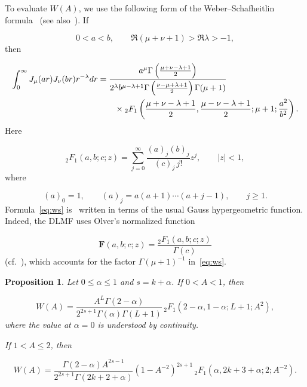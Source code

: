 \documentclass[11pt]{article}
\theoremstyle{plain}
\newtheorem{proposition}[theorem]{Proposition}
\theoremstyle{definition}
\theoremstyle{remark}
\begin{document}
To evaluate $W(A)$, we use the following form of the Weber--Schafheitlin formula~\cite[Eq.~10.22.56]{r1} (see also~\cite[Section~13.4]{r8}). If

\[
  0 < a < b , \qquad  \Re (\mu + \nu + 1) > \Re \lambda > -1 ,
\]
then

\begin{align}
  \int_{0}^{\infty } J_\mu (ar) J_\nu (br) r^{-\lambda } dr
  &= \frac{a^\mu \Gamma \left( \frac{\mu +\nu -\lambda +1}{2} \right)}{2^\lambda b^{\mu -\lambda +1} \Gamma \left( \frac{\nu -\mu +\lambda +1}{2} \right) \Gamma (\mu +1)} \notag \\
  &\qquad \times {}_{2}F_{1}\left( \frac{\mu +\nu -\lambda +1}{2}, \frac{\mu -\nu -\lambda +1}{2}; \mu +1; \frac{a^{2}}{b^{2}} \right) . \label{eq:ws}
\end{align}
Here

\[
  {}_{2}F_{1}(a,b;c;z) = \sum_{j=0}^{\infty } \frac{(a)_j (b)_j}{(c)_j\, j!} z^j , \qquad  |z| < 1 ,
\]
where

\[
  (a)_{0} = 1 , \qquad  (a)_j = a(a+1)\cdots (a+j-1) , \qquad  j \ge 1 .
\]
Formula~\eqref{eq:ws} is~\cite[Eq.~10.22.56]{r1} written in terms of the usual Gauss hypergeometric function. Indeed, the DLMF uses Olver's normalized function

\[
  \mathbf{F}(a,b;c;z) = \frac{{}_{2}F_{1}(a,b;c;z)}{\Gamma (c)}
\]
(cf.~\cite[Eq.~15.1.2]{r1}), which accounts for the factor $\Gamma (\mu +1)^{-1}$ in~\eqref{eq:ws}.

\begin{proposition}\label{res:4.2}
Let $0 \le \alpha \le 1$ and $s = k + \alpha$. If $0 < A < 1$, then

\begin{equation}\label{eq:Wsmall}
  W(A) = \frac{A^{L}\Gamma (2-\alpha )}{2^{2s+1}\Gamma (\alpha )\Gamma (L+1)}\, {}_{2}F_{1}\left( 2-\alpha , 1-\alpha ; L+1; A^{2} \right) ,
\end{equation}
where the value at $\alpha = 0$ is understood by continuity.

If $1 < A \le 2$, then

\begin{equation}\label{eq:Wbig}
  W(A) = \frac{\Gamma (2-\alpha )A^{2s-1}}{2^{2s+1}\Gamma (2k+2+\alpha )} (1 - A^{-2})^{2s+1}\, {}_{2}F_{1}\left( \alpha , 2k+3+\alpha ; 2; A^{-2} \right) .
\end{equation}
\end{proposition}
\end{document}
